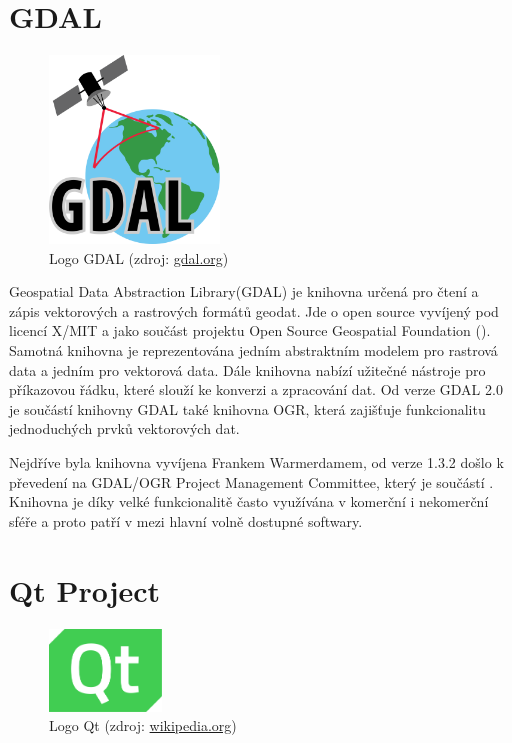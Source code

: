 \section{GDAL}

\begin{figure}[H]
	 \centering
      \includegraphics[height=5cm]{./pictures/gdal-logo.png}
      \caption{Logo GDAL (zdroj:
\href{https://upload.wikimedia.org/wikipedia/commons/thumb/d/df/GDALLogoColor.svg/572px-GDALLogoColor.svg.png}{gdal.org})}
      \label{fig:gdal}
  \end{figure}
  
Geospatial Data Abstraction Library(GDAL) je knihovna určená pro čtení a zápis vektorových a rastrových formátů geodat. Jde o open source vyvíjený pod licencí X/MIT a jako součást projektu Open Source Geospatial Foundation (). Samotná knihovna je reprezentována jedním abstraktním modelem pro rastrová data a jedním pro vektorová data. Dále knihovna nabízí užitečné nástroje pro příkazovou řádku, které slouží ke konverzi a zpracování dat. Od verze GDAL 2.0 je součástí knihovny GDAL také knihovna OGR, která zajišťuje funkcionalitu jednoduchých prvků vektorových dat.

Nejdříve byla knihovna vyvíjena Frankem Warmerdamem, od verze 1.3.2 došlo k převedení na GDAL/OGR Project Management Committee, který je součástí . Knihovna je díky velké funkcionalitě často využívána v komerční i nekomerční sféře a proto patří v  mezi hlavní volně dostupné softwary. \cite{gdal, gdal_wiki}

\section{Qt Project}

\begin{figure}[H]
	 \centering
      \includegraphics[width=3cm]{./pictures/qt-logo.png}
      \caption{Logo Qt (zdroj:
\href{https://upload.wikimedia.org/wikipedia/commons/thumb/0/0b/Qt_logo_2016.svg/578px-Qt_logo_2016.svg.png}{wikipedia.org})}
      \label{fig:qt}
  \end{figure}
  
